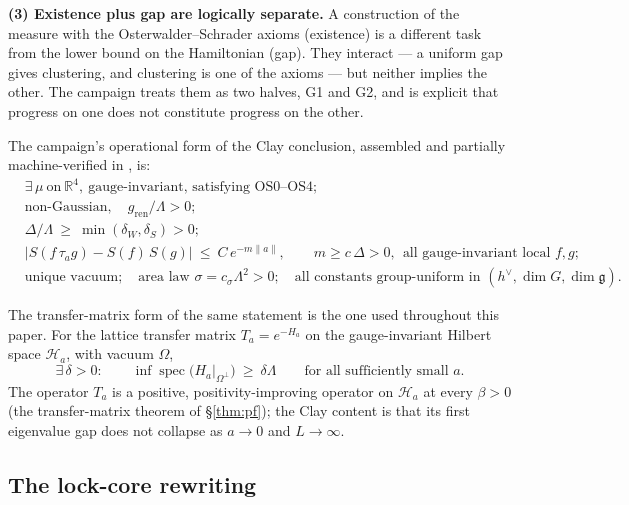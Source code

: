 \textbf{(3) Existence plus gap are logically separate.} A construction of the measure with the
Osterwalder--Schrader axioms (existence) is a different task from the lower bound on the
Hamiltonian (gap). They interact --- a uniform gap gives clustering, and clustering is one of the
axioms --- but neither implies the other. The campaign treats them as two halves, G1 and G2, and
is explicit that progress on one does not constitute progress on the other.

\figthreehalves

The campaign's operational form of the Clay conclusion, assembled and partially machine-verified
in , is:
\begin{align*}
&\exists\,\mu\ \text{on}\ \mathbb{R}^4,\ \text{gauge-invariant, satisfying OS0--OS4};\\
&\text{non-Gaussian},\quad g_{\mathrm{ren}}/\Lambda>0;\\
&\Delta/\Lambda\ \ge\ \min(\delta_W,\delta_S)>0;\\
&|S(f\,\tau_a g)-S(f)\,S(g)|\ \le\ C\,e^{-m\|a\|},\qquad
  m\ge c\,\Delta>0,\ \ \text{all gauge-invariant local } f,g;\\
&\text{unique vacuum};\quad \text{area law } \sigma=c_\sigma\Lambda^2>0;\quad
  \text{all constants group-uniform in } (h^{\vee},\dim G,\dim\mathfrak{g}).
\end{align*}

The transfer-matrix form of the same statement is the one used throughout this paper. For the
lattice transfer matrix $T_a=e^{-H_a}$ on the gauge-invariant Hilbert space $\mathcal{H}_a$, with
vacuum $\Omega$,
\begin{equation}
\exists\,\delta>0:\qquad
\inf\operatorname{spec}\!\bigl(H_a\big|_{\Omega^\perp}\bigr)\ \ge\ \delta\Lambda
\qquad\text{for all sufficiently small } a .
\label{eq:clay-transfer}
\end{equation}
The operator $T_a$ is a positive, positivity-improving operator on $\mathcal{H}_a$ at every
$\beta>0$ (the transfer-matrix theorem of \S\ref{thm:pf}); the Clay content is that its first eigenvalue gap does not
collapse as $a\to0$ and $L\to\infty$.

\subsection{The lock-core rewriting}

